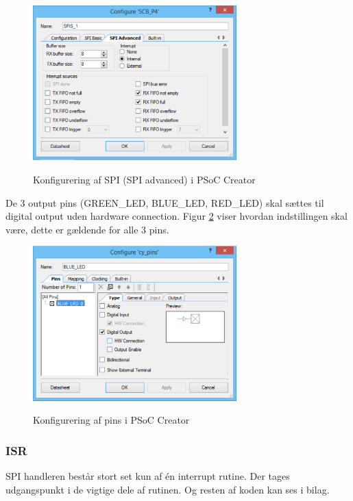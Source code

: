 \begin{figure}[H] \centering
{\includegraphics[width=0.7\textwidth]{filer/implementering/spi/spi_handler_topdesign_spi_advanced}}
\caption{Konfigurering af SPI (SPI advanced) i PSoC Creator}
\label{lab:spi_advanced_config}
\raggedright
\end{figure}

De 3 output pins (GREEN\_LED, BLUE\_LED, RED\_LED) skal sættes til digital output uden hardware connection.
Figur \ref{lab:led_pins_config} viser hvordan indstillingen skal være, dette er gældende for alle 3 pins. 

\begin{figure}[H] \centering
{\includegraphics[width=0.7\textwidth]{filer/implementering/spi/spi_handler_topdesign_led}}
\caption{Konfigurering af pins i PSoC Creator}
\label{lab:led_pins_config}
\raggedright
\end{figure}


\subsubsection*{ISR}

SPI handleren består stort set kun af én interrupt rutine. Der tages udgangspunkt i de vigtige dele af rutinen. Og resten af koden kan ses i bilag.


